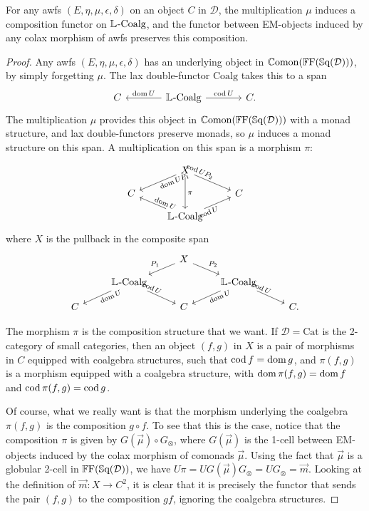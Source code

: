 \begin{corollary}\label{Cor:CoalgComp}
	For any awfs $(E,\eta,\mu,\epsilon,\delta)$ on an object $C$ in $\mathcal{D}$, the multiplication $\mu$ induces a composition functor on $\mathbb{L}_{}\text{-}\mathrm{Coalg}$, and the functor between EM-objects induced by any colax morphism of awfs preserves this composition.
\end{corollary}
\begin{proof}
	Any awfs $(E,\eta,\mu,\epsilon,\delta)$ has an underlying object in $\mathbb{C}\mathrm{omon}(\mathbb{F}\mathrm{F}(\mathbb{S}\mathrm{q}(\mathcal{D})))$, by simply forgetting $\mu$. The lax double-functor $\mathrm{Coalg}$ takes this to a span
	\[
	\begin{tikzcd}[column sep=large]
		C & \LCoalg \lar[swap]{\dom U} \rar{\cod U} & C.
	\end{tikzcd}
	\]
	The multiplication $\mu$ provides this object in $\mathbb{C}\mathrm{omon}(\mathbb{F}\mathrm{F}(\mathbb{S}\mathrm{q}(\mathcal{D})))$ with a monad structure, and lax double-functors preserve monads, so $\mu$ induces a monad structure on this span. A multiplication on this span is a morphism $\pi$:
	\[
	\begin{tikzcd}[row sep=small,sloped,pos=.1]
		{} & X \dlar[swap]{\dom UP_1} \drar{\cod UP_2} \ar{dd}[sloped=false,pos=.5]{\pi} & \\
		C && C \\
		& \LCoalg \ular{\dom U} \urar[swap]{\cod U}
	\end{tikzcd}
	\]
	where $X$ is the pullback in the composite span
	\[
	\begin{tikzcd}[row sep=small]
		{} && X \dlar[swap]{P_1} \drar{P_2} && \\
		& \LCoalg \dlar[swap,sloped,pos=.1]{\dom U} \drar[sloped,pos=.1]{\cod U}
			&& \LCoalg \dlar[swap,sloped,pos=.1]{\dom U} \drar[sloped,pos=.1]{\cod U} & \\
		C && C && C.
	\end{tikzcd}
	\]

	The morphism $\pi$ is the composition structure that we want. If $\mathcal{D}=\mathrm{Cat}$ is the 2-category of small categories, then an object $(f,g)$ in $X$ is a pair of morphisms in $C$ equipped with coalgebra structures, such that $\operatorname{cod} f = \operatorname{dom} g$, and $\pi(f,g)$ is a morphism equipped with a coalgebra structure, with $\operatorname{dom} \pi(f,g)=\operatorname{dom} f$ and $\operatorname{cod} \pi(f,g)=\operatorname{cod} g$.

	Of course, what we really want is that the morphism underlying the coalgebra $\pi(f,g)$ is the composition $g\circ f$. To see that this is the case, notice that the composition $\pi$ is given by $G(\vec{\mu})\circ G_{\otimes}$, where $G(\vec{\mu})$ is the 1-cell between EM-objects induced by the colax morphism of comonads $\vec{\mu}$. Using the fact that $\vec{\mu}$ is a globular 2-cell in $\mathbb{F}\mathrm{F}(\mathbb{S}\mathrm{q}(\mathcal{D}))$, we have $U\pi=UG(\vec{\mu})G_{\otimes}=UG_{\otimes}=\vec{m}$. Looking at the definition of $\vec{m}\colon X\to C^2$, it is clear that it is precisely the functor that sends the pair $(f,g)$ to the composition $gf$, ignoring the coalgebra structures.
\end{proof}

